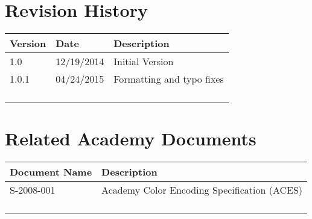 \prelimsectionformat	%
\chapter{Revision History}

\begin{tabularx}{\linewidth}{|l|l|X|}
    \hline
    Version & Date       & Description \\ \hline
    1.0     & 12/19/2014 & Initial Version
    \\ \hline
    1.0.1   & 04/24/2015 & Formatting and typo fixes \\ \hline
    &   &   \\ \hline
    &   &   \\ \hline
    &   &   \\ \hline
    &   &   \\ \hline
\end{tabularx}

\vspace{0.25in} %
\chapter{Related Academy Documents} %
\begin{tabularx}{\linewidth}{|l|X|}
    \hline
    Document Name & Description \\ \hline
    S-2008-001 & Academy Color Encoding Specification (ACES) \\ \hline
    & \\ \hline
    & \\ \hline
    & \\ \hline
    & \\ \hline
\end{tabularx}
